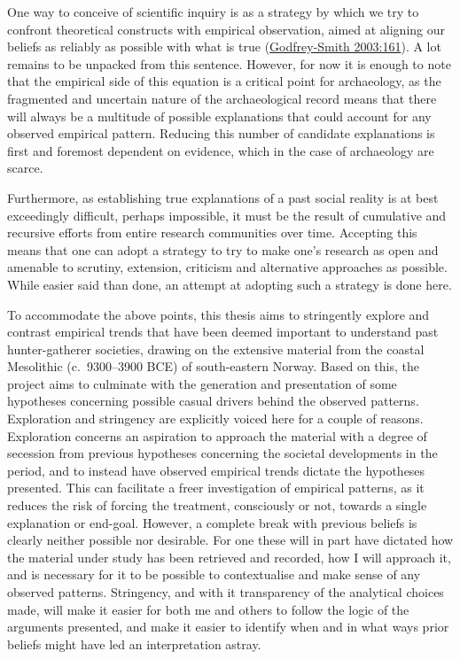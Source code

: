 \documentclass[
  12pt,
  a4paper,
  oneside]{book}
\begin{document}
One way to conceive of scientific inquiry is as a strategy by which we try to confront theoretical constructs with empirical observation, aimed at aligning our beliefs as reliably as possible with what is true (\protect\hyperlink{ref-godfrey-smith2003}{Godfrey-Smith 2003:161}). A lot remains to be unpacked from this sentence. However, for now it is enough to note that the empirical side of this equation is a critical point for archaeology, as the fragmented and uncertain nature of the archaeological record means that there will always be a multitude of possible explanations that could account for any observed empirical pattern. Reducing this number of candidate explanations is first and foremost dependent on evidence, which in the case of archaeology are scarce.

Furthermore, as establishing true explanations of a past social reality is at best exceedingly difficult, perhaps impossible, it must be the result of cumulative and recursive efforts from entire research communities over time. Accepting this means that one can adopt a strategy to try to make one's research as open and amenable to scrutiny, extension, criticism and alternative approaches as possible. While easier said than done, an attempt at adopting such a strategy is done here.

To accommodate the above points, this thesis aims to stringently explore and contrast empirical trends that have been deemed important to understand past hunter-gatherer societies, drawing on the extensive material from the coastal Mesolithic (c.~9300--3900 BCE) of south-eastern Norway. Based on this, the project aims to culminate with the generation and presentation of some hypotheses concerning possible casual drivers behind the observed patterns. Exploration and stringency are explicitly voiced here for a couple of reasons. Exploration concerns an aspiration to approach the material with a degree of secession from previous hypotheses concerning the societal developments in the period, and to instead have observed empirical trends dictate the hypotheses presented. This can facilitate a freer investigation of empirical patterns, as it reduces the risk of forcing the treatment, consciously or not, towards a single explanation or end-goal. However, a complete break with previous beliefs is clearly neither possible nor desirable. For one these will in part have dictated how the material under study has been retrieved and recorded, how I will approach it, and is necessary for it to be possible to contextualise and make sense of any observed patterns. Stringency, and with it transparency of the analytical choices made, will make it easier for both me and others to follow the logic of the arguments presented, and make it easier to identify when and in what ways prior beliefs might have led an interpretation astray.
\end{document}
